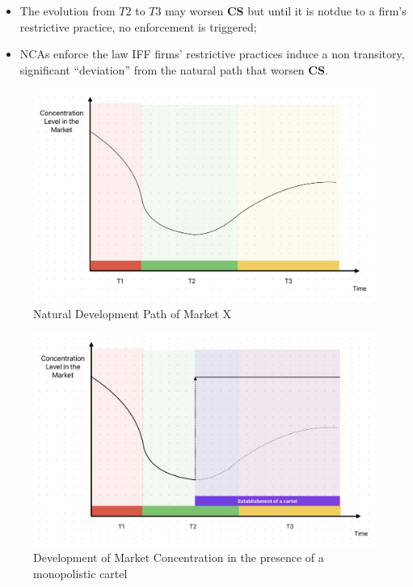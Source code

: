     \begin{itemize}
        \item The evolution from $T2$ to $T3$ may worsen \textcolor{BrickRed}{\textbf{CS}} but until it is notdue to a firm’s restrictive practice, no enforcement is triggered;
        \item NCAs enforce the law IFF firms’ restrictive practices induce a non transitory, significant “deviation” from the natural path that worsen \textcolor{BrickRed}{\textbf{CS}}.
    \end{itemize}

    \begin{figure}[h]
        \centering
        \includegraphics[width=0.85\linewidth]{graphics/Market_evolution.png}
        \caption{Natural Development Path of Market X}
        \label{fig:nat_dev_path_mkt}
    \end{figure}

    \begin{figure}[h]
        \centering
        \includegraphics[width=0.85\linewidth]{graphics/establishment_cartel.png}
        \caption{Development of Market Concentration in the presence of a monopolistic cartel}
    \end{figure}

